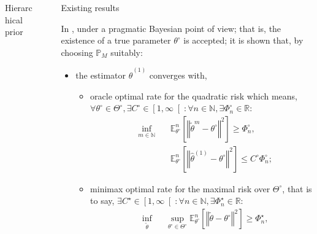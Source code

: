 \documentclass[final,hyperref={pdfpagelabels=false}]{beamer}
\begin{document}
\begin{frame}[t]
\begin{columns}[t]
\begin{column}{.30\textwidth}
\begin{block}{\rule{0pt}{2.5ex} Hierarchical prior}
\end{block}

\end{column} %

\begin{column}{.02\textwidth}\end{column} %

\begin{column}{.30\textwidth} %


\begin{block}{\rule{0pt}{2.5ex} Existing results}
In \citet{JJASRS}, under a \textcolor{red!90!black}{pragmatic Bayesian} point of view; that is, the existence of a true parameter $\theta^{\circ}$ is accepted; it is shown that, by choosing $\mathbb{P}_{M}$ suitably:
\begin{itemize}
	\item the estimator $\widehat{\theta}^{\left(1\right)}$ \textcolor{red!90!black}{converges with,}
	\begin{itemize}
		\item \textcolor{red!90!black}{oracle optimal rate} for the quadratic risk which means, $\forall \theta^{\circ} \in \Theta^{\circ}, \exists C^{\circ} \in \left[ 1, \infty \right[ : \forall n \in \mathbb{N}, \exists \Phi_{n}^{\circ} \in \mathbb{R}:$
		\begin{alignat*}{2}
&\inf\limits_{m \in \mathbb{N}} \, && \mathbb{E}_{\theta^{\circ}}^{n}\left[\left\Vert \tilde{\theta}^{m} - \theta^{\circ} \right\Vert^{2}\right] \geq \Phi_{n}^{\circ},\\
& && \mathbb{E}_{\theta^{\circ}}^{n}\left[\left\Vert \widehat{\theta}^{\left(1\right)} - \theta^{\circ} \right\Vert^{2}\right] \leq C^{\circ} \Phi_{n}^{\circ};
		\end{alignat*}
		\item \textcolor{red!90!black}{minimax optimal rate} for the maximal risk over $\Theta^{\circ}$, that is to say, $\exists C^{\star} \in \left[ 1, \infty \right[ : \forall n \in \mathbb{N}, \exists \Phi_{n}^{\star} \in \mathbb{R}:$
\begin{alignat*}{2}
& \inf\limits_{\tilde{\theta}} &&\sup\limits_{\theta^{\circ} \in \Theta^{\circ}} \mathbb{E}_{\theta^{\circ}}^{n}\left[\left\Vert \tilde{\theta} - \theta^{\circ} \right\Vert^{2}\right] \geq \Phi_{n}^{\star},\\

\end{alignat*}
\end{itemize}
\end{itemize}
\end{block}
\end{column}
\end{columns}
\end{frame}
\end{document}
